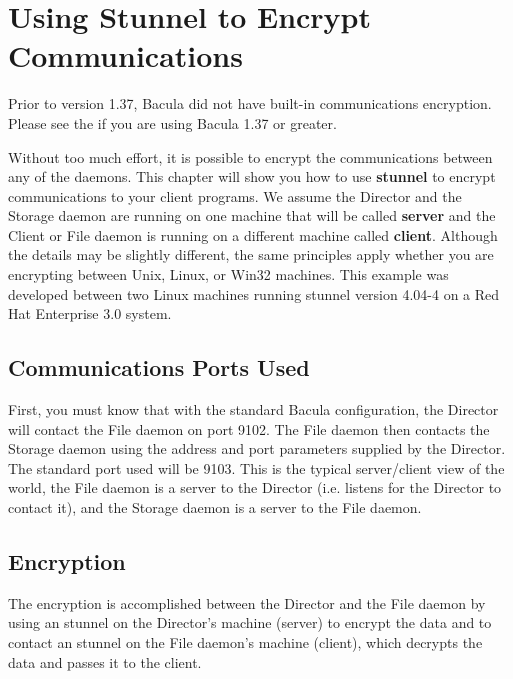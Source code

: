 
\chapter{Using Stunnel to Encrypt Communications}
\label{StunnelChapter}

Prior to version 1.37, Bacula did not have built-in communications encryption.
Please see the  if you are using Bacula
1.37 or greater.

Without too much effort, it is possible to encrypt the communications
between any of the daemons. This chapter will show you how to use {\bf
stunnel} to encrypt communications to your client programs. We assume the
Director and the Storage daemon are running on one machine that will be called
{\bf server} and the Client or File daemon is running on a different machine
called {\bf client}. Although the details may be slightly different, the same
principles apply whether you are encrypting between Unix, Linux, or Win32
machines. This example was developed between two Linux machines running
stunnel version 4.04-4 on a Red Hat Enterprise 3.0 system. 

\section{Communications Ports Used}

First, you must know that with the standard Bacula configuration, the Director
will contact the File daemon on port 9102. The File daemon then contacts the
Storage daemon using the address and port parameters supplied by the Director.
The standard port used will be 9103. This is the typical server/client view of
the world, the File daemon is a server to the Director (i.e. listens for the
Director to contact it), and the Storage daemon is a server to the File
daemon.

\section{Encryption}

The encryption is accomplished between the Director and the File daemon by
using an stunnel on the Director's machine (server) to encrypt the data and to
contact an stunnel on the File daemon's machine (client), which decrypts the
data and passes it to the client. 

